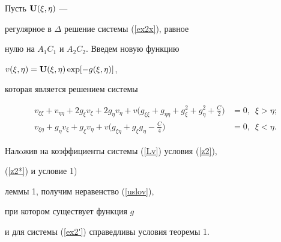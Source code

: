 \begin{pf}


Пусть ${\bold U}(\xi,\eta)$ ---


регулярное в $\Delta$ решение системы (\ref{ex2x}), равное


нулю на $A_1C_1$ и $A_2C_2$. Введем новую функцию


$v(\xi,\eta)={\bold U}(\xi,\eta)\exp[-g(\xi,\eta)]$,






которая является решением системы


\begin{equation}\label{Lv}


\begin{split}


v_{\xi\xi}+v_{\eta\eta}+2g_{\xi} v_{\xi}+2g_{\eta} v_{\eta} +


v\bigg(g_{\xi\xi}+g_{\eta\eta}+g_{\xi}^2+g_{\eta}^2+


\frac{C}{2}\bigg)&=0,\ \;\xi>\eta;\\


%


v_{\xi\eta}+g_{\eta} v_{\xi}+g_{\xi} v_{\eta}+v\bigg(g_{\xi\eta}


+g_{\xi} g_{\eta}-\frac{C}{4}\bigg)&=0,\ \;\xi<\eta.


\end{split}


\end{equation}





Налoжив на коэффициенты системы (\ref{Lv}) условия (\ref{z2}),


(\ref{z2*}) и условие 1)


леммы 1, получим неравенство (\ref{uslov}),


при котором существует функция $g$


и для системы (\ref{ex2'}) справедливы условия теоремы 1.


\end{pf}





